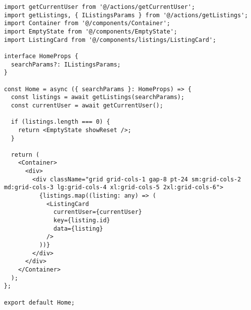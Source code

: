 \begin{verbatim}
import getCurrentUser from '@/actions/getCurrentUser';
import getListings, { IListingsParams } from '@/actions/getListings';
import Container from '@/components/Container';
import EmptyState from '@/components/EmptyState';
import ListingCard from '@/components/listings/ListingCard';

interface HomeProps {
  searchParams?: IListingsParams;
}

const Home = async ({ searchParams }: HomeProps) => {
  const listings = await getListings(searchParams);
  const currentUser = await getCurrentUser();

  if (listings.length === 0) {
    return <EmptyState showReset />;
  }

  return (
    <Container>
      <div>
        <div className="grid grid-cols-1 gap-8 pt-24 sm:grid-cols-2 md:grid-cols-3 lg:grid-cols-4 xl:grid-cols-5 2xl:grid-cols-6">
          {listings.map((listing: any) => (
            <ListingCard
              currentUser={currentUser}
              key={listing.id}
              data={listing}
            />
          ))}
        </div>
      </div>
    </Container>
  );
};

export default Home;

\end{verbatim}